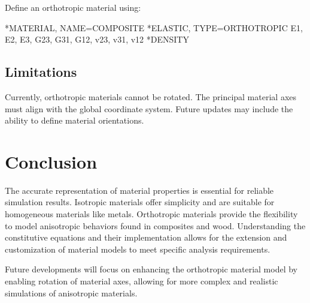 Define an orthotropic material using:

\begin{codeBlock}
*MATERIAL, NAME=COMPOSITE
*ELASTIC, TYPE=ORTHOTROPIC
E1, E2, E3, G23, G31, G12, v23, v31, v12
*DENSITY
\rho
\end{codeBlock}

\subsection{Limitations}

Currently, orthotropic materials cannot be rotated. The principal material axes must align with the global coordinate system. Future updates may include the ability to define material orientations.

\section{Conclusion}

The accurate representation of material properties is essential for reliable simulation results. Isotropic materials offer simplicity and are suitable for homogeneous materials like metals. Orthotropic materials provide the flexibility to model anisotropic behaviors found in composites and wood. Understanding the constitutive equations and their implementation allows for the extension and customization of material models to meet specific analysis requirements.

Future developments will focus on enhancing the orthotropic material model by enabling rotation of material axes, allowing for more complex and realistic simulations of anisotropic materials.
